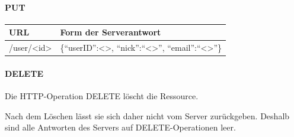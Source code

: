 \paragraph{PUT}
\begin{center}
\begin{longtable}{| p{4.1cm} | p{10cm} |}
\hline
URL & Form der Serverantwort \\
\hline \hline
/user/<id> & \{``userID'':<>, ``nick'':``<>'', ``email'':``<>''\} \\
\hline
\end{longtable}
\end{center}

\paragraph{DELETE}
Die HTTP-Operation DELETE löscht die Ressource.

Nach dem Löschen lässt sie sich daher nicht vom Server zurückgeben. Deshalb sind alle Antworten des Servers auf DELETE-Operationen leer.
